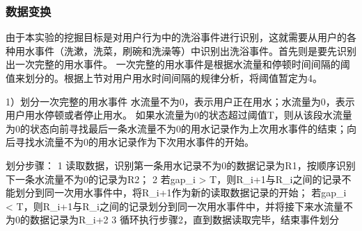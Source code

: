 \documentclass[11pt]{article}
\begin{document}
    \subsubsection{数据变换}\label{ux6570ux636eux53d8ux6362}

由于本实验的挖掘目标是对用户行为中的洗浴事件进行识别，这就需要从用户的各种用水事件（洗漱，洗菜，刷碗和洗澡等）中识别出洗浴事件。首先则是要先识别出一次完整的用水事件。
一次完整的用水事件是根据水流量和停顿时间间隔的阈值来划分的。根据上节对用户用水时间间隔的规律分析，将阈值暂定为4。

1）划分一次完整的用水事件
水流量不为0，表示用户正在用水；水流量为0，表示用户用水停顿或者停止用水。
如果水流量为0的状态超过阈值T，则从该段水流量为0的状态向前寻找最后一条水流量不为0的用水记录作为上次用水事件的结束；向后寻找水流量不为0的用水记录作为下次用水事件的开始。

划分步骤： 1
读取数据，识别第一条用水记录不为0的数据记录为R1，按顺序识别下一条水流量不为0的记录为R2；
2 若gap\_i \textgreater{}
T，则R\_i+1与R\_i之间的记录不能划分到同一次用水事件中，将R\_i+1作为新的读取数据记录的开始；
若gap\_i \textless{}
T，则R\_i+1与R\_i之间的记录划分到同一次用水事件中，并将接下来水流量不为0的数据记录为R\_i+2
3 循环执行步骤2，直到数据读取完毕，结束事件划分
\end{document}
